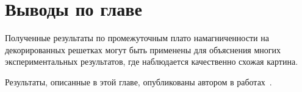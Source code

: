 \section{Выводы по главе}

Полученные результаты по промежуточным плато намагниченности на декорированных решетках могут быть применены для объяснения многих экспериментальных результатов, где наблюдается качественно схожая картина.

Результаты, описанные в этой главе, опубликованы автором в работах~\cite{confbib3, confbib4, confbib5, vakbib2}.

\FloatBarrier
